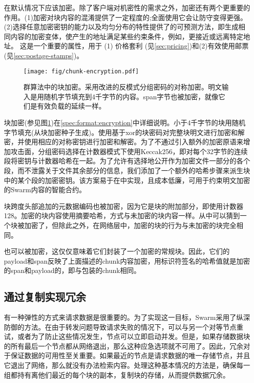 在默认情况下应该加密。除了客户端对机密性的需求之外，加密还有两个更重要的作用。(1)加密对块内容的混淆提供了一定程度的;全面使用它会让防守变得更强。(2)选择任意加密密钥的能力以及均匀分布的特性提供了的可预测方法，即生成相同内容的加密变体，使产生的地址满足某些约束条件，例如，更接近或远离特定地址。 这是一个重要的属性，用于 (1) 价格套利 (见\ref{sec:pricing})和(2)有效使用邮票(见\ref{sec:postage-stamps})。


\begin{figure}[htbp]
    \centering
    \texttt{[image: fig/chunk-encryption.pdf]}
    \caption[群中的块加密\statusgreen]{群算法中的块加密。采用改进的反模式分组密码的对称加密。明文输入是用随机字节填充到4千字节的内容。span字节也被加密，就像它们是有效负载的延续一样。}
    \label{fig:chunk-encryption}
\end{figure}


块加密(参见图\ref{fig:chunk-encryption})在\ref{spec:format:encryption}中详细说明。小于4千字节的块用随机字节填充(从块加密种子生成)。使用基于xor的块密码对完整块明文进行加密和解密，并使用相应的对称密钥进行加密和解密。为了不通过引入额外的加密原语来增加攻击面，分组密码选择在计数器模式下使用Keccak256，即对每个32字节的连续段将密钥与计数器哈希在一起。为了允许有选择地公开作为加密文件一部分的各个段，而不泄露关于文件其余部分的信息，我们添加了一个额外的哈希步骤来派生块中的某个段的加密密钥。该方案易于在中实现，且成本低廉，可用于约束明文加密的Swarm内容的智能合约。

块跨度头部追加的元数据编码也被加密，因为它是块的附加部分，即使用计数器128。加密的块内容使用摘要哈希，方式与未加密的块内容一样。从中可以猜到一个块被加密了，但除此之外，在网络层中，加密的块的行为与未加密的块完全相同。

也可以被加密，这仅仅意味着它们封装了一个加密的常规块。因此，它们的payload和span反映了上面描述的chunk内容加密，用标识符签名的哈希值就是加密的span和payload的，即与包装的chunk相同。

\subsection{通过复制实现冗余\statusgreen}\label{sec:redundancy-by-local-replication}

有一种弹性的方式来请求数据是很重要的。为了实现这一目标，Swarm采用了纵深防御的方法。在由于转发问题导致请求失败的情况下，可以与另一个对等节点重试，或者为了防止这些情况发生，节点可以立即启动并发。但是，如果存储数据块的所有最后一个节点都从网络退出，那么这种应急选项就不可用了。因此，冗余对于保证数据的可用性至关重要。如果最近的节点是请求数据的唯一存储节点，并且它退出了网络，那么就没有办法检索内容。处理这种基本情况的方法是，确保每一组都持有离他们最近的每个块的副本，复制块的存储，从而提供数据冗余。 

